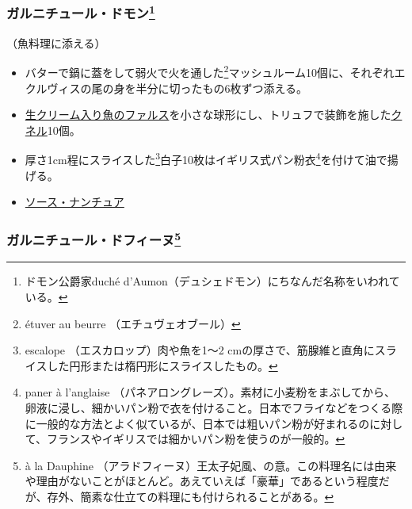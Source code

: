 \begin{recette}
\hypertarget{garniture-Daumont}{%
\subsubsection[ガルニチュール・ドモン]{\texorpdfstring{ガルニチュール・ドモン\footnote{ドモン公爵家duché
  d'Aumon（デュシェドモン）にちなんだ名称をいわれている。}}{ガルニチュール・ドモン}}\label{garniture-Daumont}}



（魚料理に添える）

\begin{itemize}
\item
  バターで鍋に蓋をして弱火で火を通した\footnote{étuver au beurre
    （エチュヴェオブール）}マッシュルーム10個に、それぞれエクルヴィスの尾の身を半分に切ったもの6枚ずつ添える。
\item
  \protect\hyperlink{farce-c}{生クリーム入り魚のファルス}を小さな球形にし、トリュフで装飾を施した\protect\hyperlink{quenelles}{クネル}10個。
\item
  厚さ1cm程にスライスした\footnote{escalope （エスカロップ）肉や魚を1〜2
    cmの厚さで、筋腺維と直角にスライスした円形または楕円形にスライスしたもの。}白子10枚はイギリス式パン粉衣\footnote{paner
    à l'anglaise
    （パネアロングレーズ）。素材に小麦粉をまぶしてから、卵液に浸し、細かいパン粉で衣を付けること。日本でフライなどをつくる際に一般的な方法とよく似ているが、日本では粗いパン粉が好まれるのに対して、フランスやイギリスでは細かいパン粉を使うのが一般的。}を付けて油で揚げる。
\item
  \protect\hyperlink{sauce-nantua}{ソース・ナンチュア}
\end{itemize}

\atoaki{}

\hypertarget{garniture-a-la-dauphine}{%
\subsubsection[ガルニチュール・ドフィーヌ]{\texorpdfstring{ガルニチュール・ドフィーヌ\footnote{à
  la Dauphine
  （アラドフィーヌ）王太子妃風、の意。この料理名には由来や理由がないことがほとんど。あえていえば「豪華」であるという程度だが、存外、簡素な仕立ての料理にも付けられることがある。}}{ガルニチュール・ドフィーヌ}}\label{garniture-a-la-dauphine}}


\end{recette}

